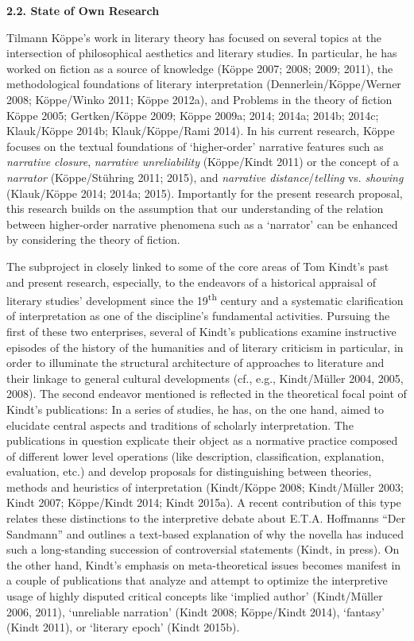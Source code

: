 

\noindent\textbf{\large 2.2. State of Own Research}

\vspace{.2cm}
\noindent Tilmann K\"oppe's work in literary theory has focused on several topics at
the intersection of philosophical aesthetics and literary studies. In
particular, he has worked on fiction as a source of knowledge (K\"oppe
2007; 2008; 2009; 2011), the methodological foundations of literary
interpretation (Dennerlein/K\"oppe/Werner 2008; K\"oppe/Winko 2011; K\"oppe
2012a), and Problems in the theory of fiction K\"oppe 2005; Gertken/K\"oppe
2009; K\"oppe 2009a; 2014; 2014a; 2014b; 2014c; Klauk/K\"oppe 2014b;
Klauk/K\"oppe/Rami 2014). In his current research, K\"oppe focuses on the
textual foundations of `higher-order' narrative features such as
\emph{narrative closure}, \emph{narrative unreliability} (K\"oppe/Kindt
2011) or the concept of a \emph{narrator} (K\"oppe/St\"uhring 2011; 2015),
and \emph{narrative distance}/\emph{telling} vs. \emph{showing}
(Klauk/K\"oppe 2014; 2014a; 2015). Importantly for the present research
proposal, this research builds on the assumption that our understanding
of the relation between higher-order narrative phenomena such as a
`narrator' can be enhanced by considering the theory of fiction.


The subproject in closely linked to some of the core areas of Tom
Kindt's past and present research, especially, to the endeavors of a
historical appraisal of literary studies' development since the
19\textsuperscript{th} century and a systematic clarification of
interpretation as one of the discipline's fundamental activities.
Pursuing the first of these two enterprises, several of Kindt's
publications examine instructive episodes of the history of the
humanities and of literary criticism in particular, in order to
illuminate the structural architecture of approaches to literature and
their linkage to general cultural developments (cf., e.g., Kindt/M\"uller
2004, 2005, 2008). The second endeavor mentioned is reflected in the
theoretical focal point of Kindt's publications: In a series of studies,
he has, on the one hand, aimed to elucidate central aspects and
traditions of scholarly interpretation. The publications in question
explicate their object as a normative practice composed of different
lower level operations (like description, classification, explanation,
evaluation, etc.) and develop proposals for distinguishing between
theories, methods and heuristics of interpretation (Kindt/K\"oppe 2008;
Kindt/M\"uller 2003; Kindt 2007; K\"oppe/Kindt 2014; Kindt 2015a). A recent
contribution of this type relates these distinctions to the interpretive
debate about E.T.A. Hoffmanns ``Der Sandmann'' and outlines a text-based
explanation of why the novella has induced such a long-standing
succession of controversial statements (Kindt, in press). On the other
hand, Kindt's emphasis on meta-theoretical issues becomes manifest in a
couple of publications that analyze and attempt to optimize the
interpretive usage of highly disputed critical concepts like `implied
author' (Kindt/M\"uller 2006, 2011), `unreliable narration' (Kindt 2008;
K\"oppe/Kindt 2014), `fantasy' (Kindt 2011), or `literary epoch' (Kindt
2015b).
